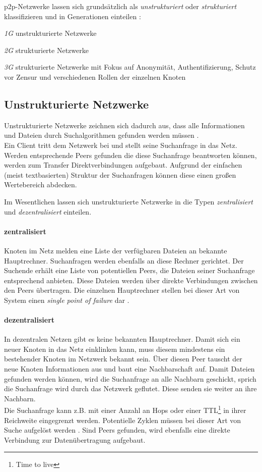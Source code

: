 p2p-Netzwerke lassen sich grundsätzlich als \emph{unstrukturiert} oder \emph{strukturiert} klassifizieren \cite{Steinmetz2005, Lua2005Survey} und in Generationen einteilen \cite{Bo2003PeertoPeer}:
\begin{itemize*}
	\item \emph{1G} unstrukturierte Netzwerke
	\item \emph{2G} strukturierte Netzwerke
	\item \emph{3G} strukturierte Netzwerke mit Fokus auf Anonymität, Authentifizierung, Schutz vor Zensur und verschiedenen Rollen der einzelnen Knoten
\end{itemize*}

\subsection{Unstrukturierte Netzwerke}
Unstrukturierte Netzwerke zeichnen sich dadurch aus, dass alle Informationen und Dateien durch Suchalgorithmen gefunden werden müssen \cite{Lv2002}. \\
Ein Client tritt dem Netzwerk bei und stellt seine Suchanfrage in das Netz. Werden entsprechende Peers gefunden die diese Suchanfrage beantworten können, werden zum Transfer Direktverbindungen aufgebaut. Aufgrund der einfachen (meist textbasierten) Struktur der Suchanfragen können diese einen großen Wertebereich abdecken.

Im Wesentlichen lassen sich unstrukturierte Netzwerke in die Typen \emph{zentralisiert} und \emph{dezentralisiert} einteilen.

\paragraph{zentralisiert} Knoten im Netz melden eine Liste der verfügbaren Dateien an bekannte Hauptrechner. Suchanfragen werden ebenfalls an diese Rechner gerichtet. Der Suchende erhält eine Liste von potentiellen Peers, die Dateien seiner Suchanfrage entsprechend anbieten. Diese Dateien werden über direkte Verbindungen zwischen den Peers übertragen. Die einzelnen Hauptrechner stellen bei dieser Art von System einen \emph{single point of failure} dar \cite{Eberspaecher2005}.

\paragraph{dezentralisiert} In dezentralen Netzen gibt es keine bekannten Hauptrechner. Damit sich ein neuer Knoten in das Netz einklinken kann, muss diesem mindestens ein bestehender Knoten im Netzwerk bekannt sein. Über diesen Peer tauscht der neue Knoten Informationen aus und baut eine Nachbarschaft auf. Damit Dateien gefunden werden können, wird die Suchanfrage an alle Nachbarn geschickt, sprich die Suchanfrage wird durch das Netzwerk geflutet. Diese senden sie weiter an ihre Nachbarn.\\
Die Suchanfrage kann z.B. mit einer Anzahl an Hops oder einer TTL\footnote{Time to live} in ihrer Reichweite eingegrenzt werden. Potentielle Zyklen müssen bei dieser Art von Suche aufgelöst werden \cite{Lv2002}. Sind Peers gefunden, wird ebenfalls eine direkte Verbindung zur Datenübertragung aufgebaut. 


